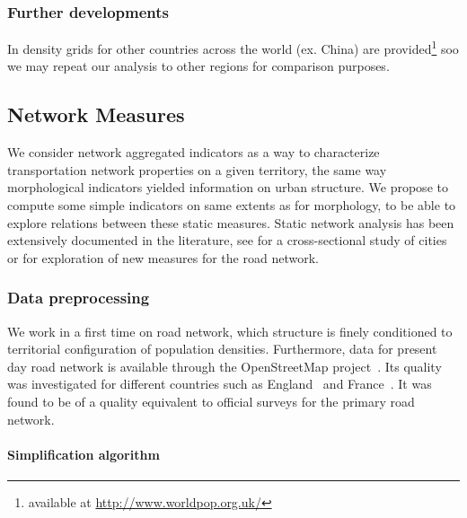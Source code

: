 \subsubsection{Further developments}

In \cite{10.1371/journal.pone.0107042} density grids for other countries across the world (ex. China) are provided\footnote{available at \url{http://www.worldpop.org.uk/}} soo we may repeat our analysis to other regions for comparison purposes.



\subsection{Network Measures}

We consider network aggregated indicators as a way to characterize transportation network properties on a given territory, the same way morphological indicators yielded information on urban structure. We propose to compute some simple indicators on same extents as for morphology, to be able to explore relations between these static measures. Static network analysis has been extensively documented in the literature, see \cite{louf2014typology} for a cross-sectional study of cities or \cite{2015arXiv151201268L} for exploration of new measures for the road network.


\subsubsection{Data preprocessing}

We work in a first time on road network, which structure is finely conditioned to territorial configuration of population densities. Furthermore, data for present day road network is available through the OpenStreetMap project~\cite{openstreetmap}. Its quality was investigated for different countries such as England~\cite{haklay2010good} and France~\cite{girres2010quality}. It was found to be of a quality equivalent to official surveys for the primary road network.





\paragraph{Simplification algorithm}

